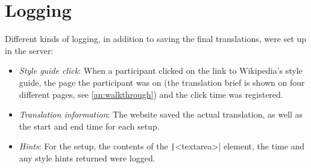 
\section{Logging}
\label{sec:logging}

\noindent Different kinds of logging, in addition to saving the final translations, were set up in the server:

\begin{itemize}
\item \textit{Style guide click}: When a participant clicked on the link to Wikipedia's style guide, the page the participant was on (the translation brief is shown on four different pages, see \autoref{an:walkthrough}) and the click time was registered.
\item \textit{Translation information}: The website saved the actual translation, as well as the start and end time for each setup.
\item \textit{Hints}: For the \style setup, the contents of the \texttt|<textarea>| element, the time and any style hints returned were logged.
\end{itemize}



